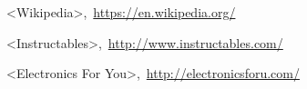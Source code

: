 \cleardoublepage
{}
{}
\begin{thebibliography}{99}

<Wikipedia>,\ \url{https://en.wikipedia.org/}

<Instructables>,\ \url{http://www.instructables.com/}

<Electronics For You>,\ \url{http://electronicsforu.com/}

\end{thebibliography}
